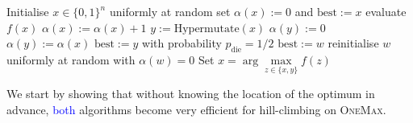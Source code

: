 \documentclass[lettersize,journal]{IEEEtran}
\newcommand{\new}[1]{\textcolor{blue}{#1}}
\begin{document}
 	\begin{algorithm}[t] 
 		\caption{$(1+1)$~Opt-IA$_{\textsc{FirstBest}}$ }
 		\begin{algorithmic}[1] %
 			\STATE Initialise $x \in\{0,1\}^n$ uniformly at random %
 			\STATE set $\alpha(x):=0$ and $\text{best}:=x$      
 			\STATE evaluate $f(x)$    
 			\STATE $\alpha(x):=\alpha(x)+1$
 			\STATE $y:=\text{Hypermutate}(x)$
 			\STATE $\alpha(y):=0$
 			\ELSE
 			\STATE $\alpha(y):=\alpha(x)$
 			\ENDIF
 			\STATE $\text{best}:=y$
 			\ENDIF
 			\STATE with probability $p_{\text{die}}=1/2$
 			{\color{blue} 
 			\STATE $\text{best}:=w$
 			\ENDIF}
 			\STATE reinitialise $w$ uniformly at random with $\alpha(w)=0$
 			\ENDIF
 			\ENDFOR
 			\STATE Set $x=\arg\max\limits_{z\in\{x,y\}}f(z)$
 			\ENDWHILE
 		\end{algorithmic} 
 		\label{alg:alg2+ageing}
 	\end{algorithm}









% 

We start by showing that without knowing the location of the optimum in advance, \new{both} algorithms become very efficient for hill-climbing on \textsc{OneMax}. %
\end{document}
